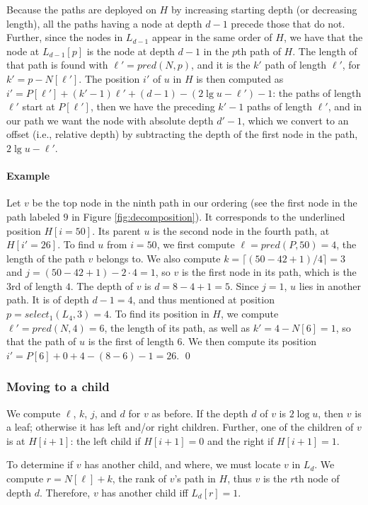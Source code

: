 \documentclass{elsarticle}
\newenvironment{example}{\paragraph{Example}}{\qed \medskip }
\begin{document}
Because the paths are deployed on $H$ by increasing starting depth (or decreasing length), all the paths having a node at depth $d-1$ precede those that do not. Further, since the nodes in $L_{d-1}$ appear in the same order of $H$, we have that the node at $L_{d-1}[p]$ is the node at depth $d-1$ in the $p$th path of $H$. The length of that path is found with $\ell' = pred(N,p)$, and it is the $k'$ path of length $\ell'$, for $k' = p-N[\ell']$. The position $i'$ of $u$ in $H$ is then computed as $i' = P[\ell']+(k'-1)\ell'+ (d-1) - (2\lg u-\ell')-1$: the paths of length $\ell'$ start at $P[\ell']$, then we have the preceding $k'-1$ paths of length $\ell'$, and in our path we want the node with absolute depth $d'-1$, which we convert to an offset (i.e., relative depth) by subtracting the depth of the first node in the path, $2\lg u - \ell'$.



\begin{example}
Let $v$ be the top node in the ninth path in our ordering (see the first node in the path labeled $9$ in Figure \ref{fig:decomposition}). It corresponds to the underlined position $H[i=50]$. Its parent $u$ is the second node in the fourth path, at $H[i'=26]$. To find $u$ from $i=50$, we first compute $\ell=pred(P,50) = 4$, the length of the path $v$ belongs to. We also compute $k=\lceil (50-42+1)/4\rceil=3$ and $j=(50-42+1)-2\cdot 4 = 1$, so $v$ is the first node in its path, which is the 3rd of length $4$. The depth of $v$ is $d=8-4+1=5$. Since $j=1$, $u$ lies in another path. It is of depth $d-1=4$, and thus mentioned at position $p=select_1(L_4,3)=4$. To find its position in $H$, we compute $\ell'=pred(N,4)=6$, the length of its path, as well as $k'=4-N[6]=1$, so that the path of $u$ is the first of length $6$. We then compute its position $i' = P[6]+0+4-(8-6)-1=26$.
\end{example}

\subsubsection{Moving to a child}
We compute $\ell$, $k$, $j$, and $d$ for $v$ as before.
If the depth $d$ of $v$ is $2\log u$, then $v$ is a leaf; otherwise it has left and/or right children. Further, one of the children of $v$ is at $H[i+1]$: the left child if $H[i+1]=0$ and the right if $H[i+1]=1$.

To determine if $v$ has another child, and where, we must locate $v$ in $L_d$. We compute $r = N[\ell]+k$, the rank of $v$'s path in $H$, thus $v$ is the $r$th node of depth $d$. Therefore, $v$ has another child iff $L_d[r]=1$.
\end{document}
